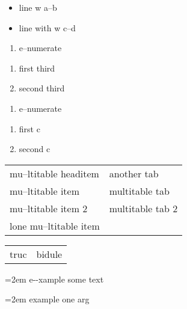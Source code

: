 \documentclass{book}
\newenvironment{GNUTexinfopreformatted}{%
  \par\begingroup\obeylines\obeyspaces\frenchspacing}{\endgroup}
\begin{document}
\begin{titlepage}
\begin{itemize}[label=\hbox{} on a line]
\item line w a--b
\item line with w c--d
\end{itemize}

\begin{enumerate}[start=1]
\item e--numerate
\end{enumerate}

\begin{enumerate}[start=3]
\item first third
\item second third
\end{enumerate}

\begin{enumerate}[label=\alph*.]
\item e--numerate
\end{enumerate}

\begin{enumerate}[label=\alph*.,start=3]
\item first c
\item second c
\end{enumerate}

\begin{tabular}{m{} m{}}%
mu--ltitable headitem &another tab\\
mu--ltitable item &multitable tab\\
mu--ltitable item 2 &multitable tab 2
\index[cp]{index entry within multitable}%
\\
lone mu--ltitable item&\\
\end{tabular}%

\begin{tabular}{m{} m{}}%
truc &bidule\\
\end{tabular}%

\begin{GNUTexinfopreformatted}
\leftskip=2em \parskip=0pt \parindent=0pt \ttfamily%
e{-}{-}xample  some
   text
\end{GNUTexinfopreformatted}

\begin{GNUTexinfopreformatted}
\leftskip=2em \parskip=0pt \parindent=0pt \ttfamily%
example one arg
\end{GNUTexinfopreformatted}


\end{titlepage}
\end{document}

